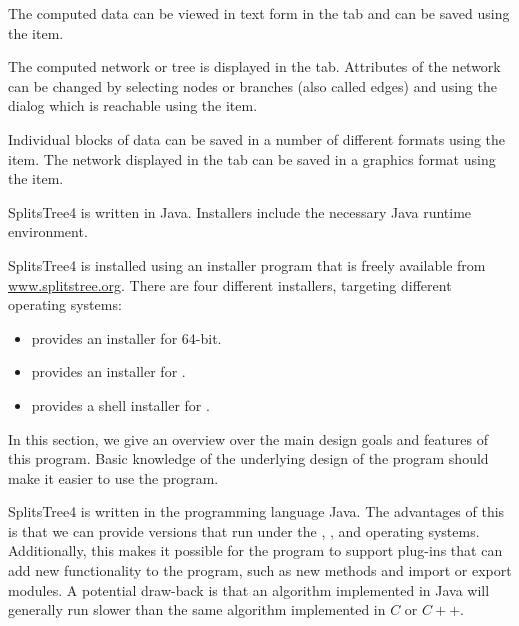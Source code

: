 \documentclass[11pt]{article}
\def\SplitsTree{{\sf SplitsTree4 }}
\begin{document}
The computed data can be viewed in text form in the 
tab and can be saved using the  item.

The computed network or tree is displayed in the 
tab. Attributes of the network can be changed by selecting nodes or branches
(also called edges)
and using the  dialog which is reachable using
the  item.

Individual blocks of data can be saved in a number of different
formats using the  item.
The network displayed in the  tab can
be saved in a graphics format using the 
item.


\SplitsTree is written in Java. Installers include the necessary Java runtime environment.

\SplitsTree is installed using an installer program that is freely available
from \href{http://www.splitstree.org}{www.splitstree.org}.
There are four different installers, targeting different operating systems:
\begin{itemize}
\item {} provides an installer for  64-bit.
\item {} provides an installer for .
\item {} provides a shell installer for .
\end{itemize}


In this section, we give an overview over the main design goals
and features of this program. Basic knowledge of the underlying design of
the program should make it easier to use the program.

\SplitsTree is written in the programming language Java.
The advantages of this is that we can provide versions that run under the
, ,  and  operating systems.
Additionally, this makes it possible for the program to support plug-ins
that can add new functionality to the program, such as new methods
and import or export modules.
A potential draw-back is that an algorithm implemented in Java will generally
run slower than the same algorithm implemented in $C$ or $C{+}{+}$.
\end{document}
